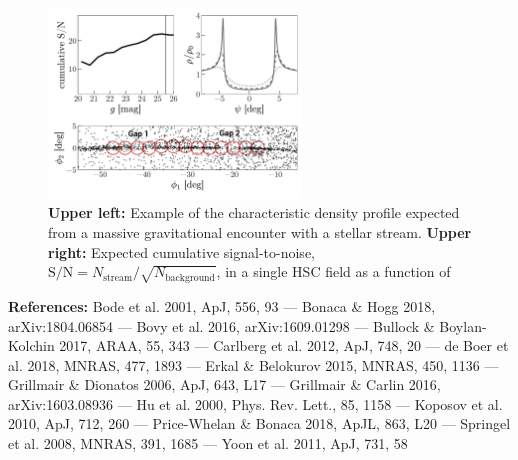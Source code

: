 \documentclass[11pt]{article}
\begin{document}
\begin{figure}[t]
\begin{center}
\includegraphics[width=0.6\textwidth]{figure1.pdf}
\caption{
\textbf{Upper left:} Example of the characteristic density profile expected from a massive gravitational encounter with a stellar stream.
\textbf{Upper right:} Expected cumulative signal-to-noise, $\textrm{S}/\textrm{N} = N_{\textrm{stream}} / \sqrt{N_{\textrm{background}}}$, in a single HSC field as a function of
}
\label{fig:}
\end{center}
\end{figure}

\textbf{References:}
Bode et al. 2001, ApJ, 556, 93 ---
Bonaca \& Hogg 2018, arXiv:1804.06854 ---
Bovy et al. 2016, arXiv:1609.01298 ---
Bullock \& Boylan-Kolchin 2017, ARAA, 55, 343 ---
Carlberg et al. 2012, ApJ, 748, 20 ---
de Boer et al. 2018, MNRAS, 477, 1893 ---
Erkal \& Belokurov 2015, MNRAS, 450, 1136 ---
Grillmair \& Dionatos 2006, ApJ, 643, L17 ---
Grillmair \& Carlin 2016, arXiv:1603.08936 ---
Hu et al. 2000, Phys. Rev. Lett., 85, 1158 ---
Koposov et al. 2010, ApJ, 712, 260 ---
Price-Whelan \& Bonaca 2018, ApJL, 863, L20 ---
Springel et al. 2008, MNRAS, 391, 1685 ---
Yoon et al. 2011, ApJ, 731, 58
\end{document}
